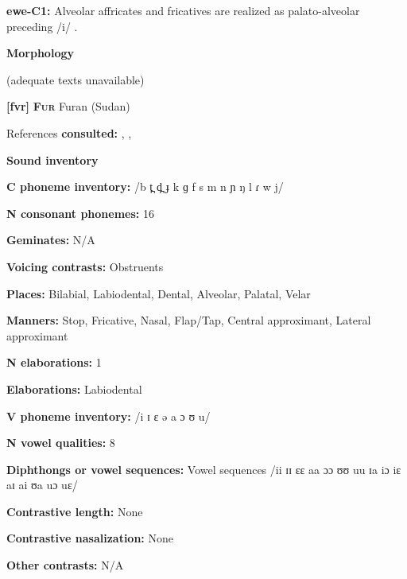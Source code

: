 \textbf{ewe-C1:} Alveolar affricates and fricatives are realized as palato-alveolar preceding /i/ \citep[9]{Jalloh2005}.



\textbf{Morphology}



(adequate texts unavailable)



\textbf{[fvr]}   \textbf{\textsc{Fur}}  Furan (Sudan)



References \textbf{consulted:} \citet{Jakobi1990},  \citet{KutschLojengaWaag2004}, \citet{Noel2008}



\textbf{Sound inventory}



\textbf{C phoneme inventory:} /b t̪ d̪ ɟ k ɡ f s m n ɲ ŋ l ɾ w j/



\textbf{N consonant phonemes:} 16



\textbf{Geminates:} N/A



\textbf{Voicing contrasts:} Obstruents



\textbf{Places:} Bilabial, Labiodental, Dental, Alveolar, Palatal, Velar



\textbf{Manners:} Stop, Fricative, Nasal, Flap/Tap, Central approximant, Lateral approximant



\textbf{N elaborations:} 1



\textbf{Elaborations:} Labiodental



\textbf{V phoneme inventory:} /i ɪ ɛ ə a ɔ ʊ u/



\textbf{N vowel qualities:} 8



\textbf{Diphthongs or vowel sequences:} Vowel sequences /ii ɪɪ ɛɛ aa ɔɔ ʊʊ uu ɪa iɔ iɛ aɪ ai ʊa uɔ uɛ/



\textbf{Contrastive length:} None



\textbf{Contrastive nasalization:} None



\textbf{Other contrasts:} N/A



